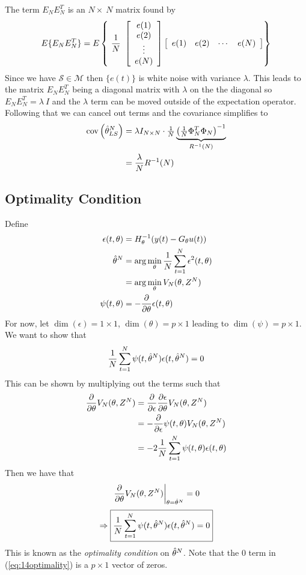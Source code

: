 The term $E_N E_N^T$ is an $N\times~N$ matrix found by
$$E\{E_N E_N^T\} = E\left\lbrace~\frac{1}{N}~\left[\begin{array}{c} e(1) \\ e(2) \\ \vdots \\ e(N) \end{array}\right] \left[\begin{array}{c c c c} e(1) & e(2) & \cdots & e(N) \end{array}\right]\right\rbrace$$
Since we have $\mathcal{S}\in\mathcal{M}$ then $\{e (t)\}$ is white noise with variance $\lambda$.
This leads to the matrix $E_NE_N^T$ being a diagonal matrix with $\lambda$ on the the diagonal so $E_N E_N^T=\lambda~I$ and the $\lambda$ term can be moved outside of the expectation operator.
Following that we can cancel out terms and the covariance simplifies to
\begin{align*}
\text{cov}\left(\hat{\theta}_{LS}^N\right) &= \lambda I_{N\times N}\cdot \tfrac{1}{N}\underbrace{{\left(\tfrac{1}{N}\Phi_N^T\Phi_N\right)}^{-1}}_{R^{-1}(N)} \\
&= \frac{\lambda}{N}R^{-1}(N)
\end{align*}

\subsection{Optimality Condition}
Define
\begin{align*}
\epsilon(t,\theta) &= H_\theta^{-1}(y(t)-G_\theta u(t)) \\
\hat{\theta}^N &= \arg\min_\theta\frac{1}{N}\sum_{t=1}^N\epsilon^2(t,\theta) \\
&= \arg\min_\theta V_N(\theta,Z^N) \\
\psi(t,\theta) &= -\frac{\partial}{\partial\theta}\epsilon(t,\theta)
\end{align*}
For now, let $\dim(\epsilon)=1\times1$, $\dim(\theta)=p\times1$ leading to $\dim(\psi)=p\times1$.
We want to show that
\begin{align*}
\frac{1}{N}\sum_{t=1}^N\psi(t,\hat{\theta}^N)\epsilon(t,\hat{\theta}^N) = 0
\end{align*}
This can be shown by multiplying out the terms such that
\begin{align*}
\frac{\partial}{\partial\theta}V_N(\theta,Z^N) &= \frac{\partial}{\partial\epsilon}\frac{\partial\epsilon}{\partial\theta}V_N(\theta,Z^N) \\
&= -\frac{\partial}{\partial\epsilon}\psi(t,\theta)V_N(\theta,Z^N) \\
&= -2\frac{1}{N}\sum_{t=1}^N\psi(t,\theta)\epsilon(t,\theta)
\end{align*}
Then we have that
\begin{align*}
\left.\frac{\partial}{\partial\theta}V_N(\theta,Z^N)\right|_{\theta=\hat{\theta}^N} = 0 \\
\end{align*}
\begin{align}
\label{eq:14optimality}
\Rightarrow \boxed{\frac{1}{N}\sum_{t=1}^N\psi(t,\hat{\theta}^N)\epsilon(t,\hat{\theta}^N) = 0}
\end{align}
This is known as the \textit{optimality condition} on $\hat{\theta}^N$.
Note that the $0$ term in (\ref{eq:14optimality}) is a $p\times1$ vector of zeros.

